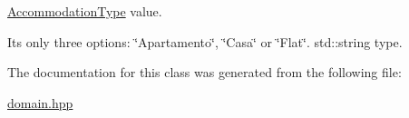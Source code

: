 \hyperlink{classAccommodationType}{Accommodation\+Type} value. 

It\textquotesingle{}s only three options\+: \char`\"{}\+Apartamento\char`\"{}, \char`\"{}\+Casa\char`\"{} or \char`\"{}\+Flat\char`\"{}. std\+::string type. 

The documentation for this class was generated from the following file\+:\begin{DoxyCompactItemize}
\item 
\hyperlink{domain_8hpp}{domain.\+hpp}\end{DoxyCompactItemize}
